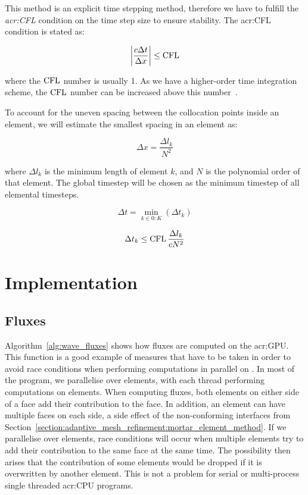 This method is an explicit time stepping method, therefore we have to fulfill the
\textit{\acrfull{acr:CFL}} condition on the time step size to ensure stability. The
\acrshort{acr:CFL} condition is stated as:

\begin{equation}
    \left| \frac{c \Delta t}{\Delta x} \right| \leq \operatorname{CFL}
\end{equation}

\noindent
where the \(\operatorname{CFL} \) number is usually 1. As we have a higher-order time integration scheme, the
\(\operatorname{CFL} \) number can be increased above this number~\cite{Gottlieb2001}.

To account for the uneven spacing between the collocation points inside an element, we will estimate
the smallest spacing in an element as: 

\begin{equation}
    \Delta x = \frac{\Delta l_k}{N^2}
\end{equation}

\noindent
where \(\Delta l_k\) is the minimum length of element \(k\), and \(N\) is the polynomial
order of that element. The global timestep will be chosen as the minimum timestep of all elemental
timesteps. 

\begin{equation}
    \Delta t = \min_{k \in 0:K} \left( \Delta t_k \right)
\end{equation}

\begin{equation}
    \Delta t_k \leq \operatorname{CFL} \frac{\Delta l_k}{cN^2}
\end{equation}

\section{Implementation}\label{section:spectral_element_method:implementation}

\subsection{Fluxes}\label{subsection:spectral_element_method:implementation:fluxes}

Algorithm~\ref{alg:wave_fluxes} shows how fluxes are computed on the \acrshort{acr:GPU}. This
function is a good example of measures that have to be taken in order to avoid race conditions when
performing computations in parallel on . In most of the program, we parallelise
over elements, with each thread performing computations on elements. When computing fluxes, both
elements on either side of a face add their contribution to the face. In addition, an element can
have multiple faces on each side, a side effect of the non-conforming interfaces from
Section~\ref{section:adaptive_mesh_refinement:mortar_element_method}. If we parallelise over
elements, race conditions will occur when multiple elements try to add their contribution to the
same face at the same time. The possibility then arises that the contribution of some elements would
be dropped if it is overwritten by another element. This is not a problem for serial or
multi-process single threaded \acrshort{acr:CPU} programs.

